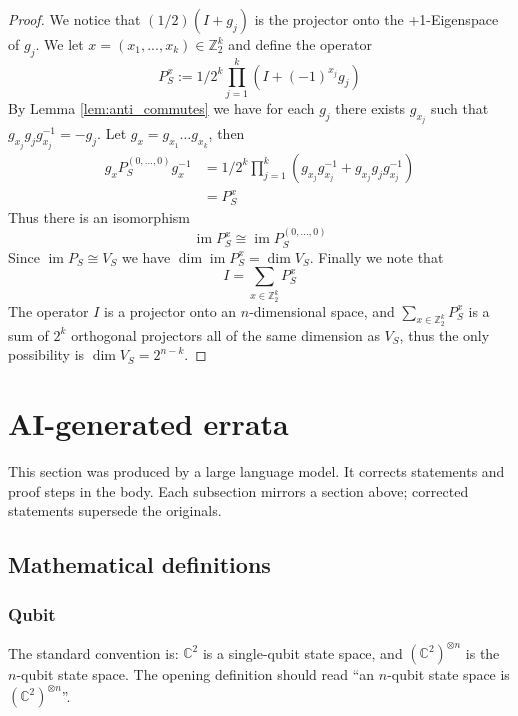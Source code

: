 \documentclass[12pt]{article}
\theoremstyle{plain}
\theoremstyle{definition}
\newcommand{\bb}[1]{\mathbb{#1}}
\begin{document}
\begin{proof}
We notice that $(1/2)(I + g_j)$ is the projector onto the +1-Eigenspace of $g_j$. We let $x = (x_1,...,x_k) \in \bb{Z}_2^k$ and define the operator
\begin{equation}
P_S^x := 1/2^{k}\prod_{j = 1}^k(I + (-1)^{x_{j}}g_j)
\end{equation}
By Lemma \ref{lem:anti_commutes} we have for each $g_j$ there exists $g_{x_j}$ such that $g_{x_j}g_j g_{x_j}^{-1} = -g_j$. Let $g_x = g_{x_1}\hdots g_{x_k}$, then
\begin{align*}
g_xP_S^{(0,...,0)} g_x^{-1} &= 1/2^k\prod_{j = 1}^k (g_{x_j}g_{x_j}^{-1} + g_{x_j} g_{j}g_{x_j}^{-1})\\
&= P_S^x
\end{align*}
Thus there is an isomorphism
\begin{equation}
\operatorname{im}P_S^x \cong \operatorname{im}P_S^{(0,...,0)}
\end{equation}
Since $\operatorname{im}P_S \cong V_S$ we have $\operatorname{dim}\operatorname{im}P_S^x = \operatorname{dim}V_S$. Finally we note that
\begin{equation}
I = \sum_{x \in \bb{Z}_2^k}P_S^x
\end{equation}
The operator $I$ is a projector onto an $n$-dimensional space, and $\sum_{x \in \bb{Z}_2^k}P_S^x$ is a sum of $2^k$ orthogonal projectors all of the same dimension as $V_S$, thus
the only possibility is $\operatorname{dim}V_S = 2^{n - k}$.
\end{proof}

\clearpage
\section{AI-generated errata}\label{sec:errata}

This section was produced by a large language model. It corrects statements and proof steps in the body. Each subsection mirrors a section above; corrected statements supersede the originals.

\subsection{Mathematical definitions}

\subsubsection*{Qubit}

The standard convention is: $\mathbb{C}^2$ is a single-qubit state space, and $(\mathbb{C}^2)^{\otimes n}$ is the $n$-qubit state space. The opening definition should read ``an $n$-qubit state space is $(\mathbb{C}^2)^{\otimes n}$''.
\end{document}

